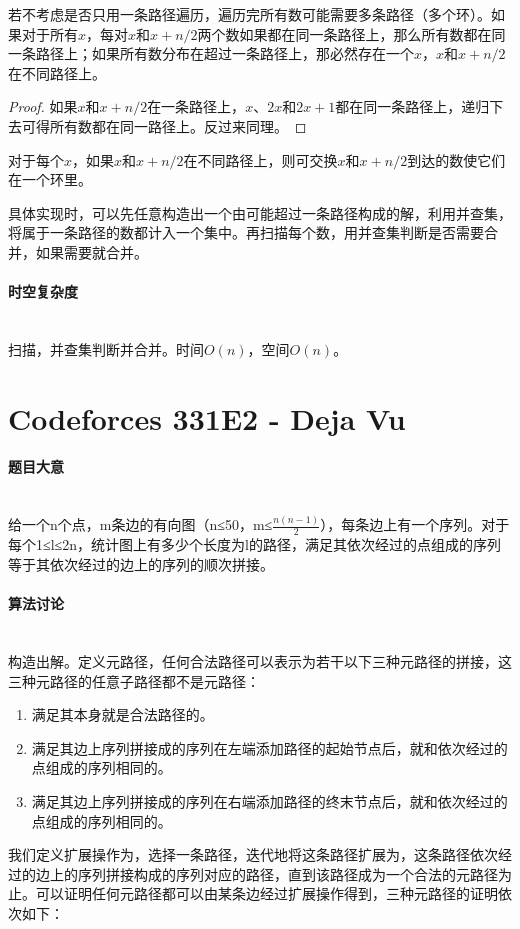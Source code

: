 \documentclass[UTF8]{ctexart}
\newcommand{\myparagraph}[1]{\paragraph{#1}\mbox{}\\}
\theoremstyle{nonumberplain}
\newtheorem{proof}{\hspace{1em}证明：}
\begin{document}
			若不考虑是否只用一条路径遍历，遍历完所有数可能需要多条路径（多个环）。如果对于所有$x$，每对$x$和$x+n/2$两个数如果都在同一条路径上，那么所有数都在同一条路径上；如果所有数分布在超过一条路径上，那必然存在一个$x$，$x$和$x+n/2$在不同路径上。
			
			\begin{proof} 如果$x$和$x+n/2$在一条路径上，$x$、$2x$和$2x+1$都在同一条路径上，递归下去可得所有数都在同一路径上。反过来同理。 \end{proof}
			
			对于每个$x$，如果$x$和$x+n/2$在不同路径上，则可交换$x$和$x+n/2$到达的数使它们在一个环里。
			
			具体实现时，可以先任意构造出一个由可能超过一条路径构成的解，利用并查集，将属于一条路径的数都计入一个集中。再扫描每个数，用并查集判断是否需要合并，如果需要就合并。
		
		\myparagraph{时空复杂度}
		
			扫描，并查集判断并合并。时间$O(n)$，空间$O(n)$。
	
	\section{Codeforces 331E2 - Deja Vu}
		
		\myparagraph{题目大意}
		
			给一个n个点，m条边的有向图（n≤50，m≤$\frac{n(n-1)}{2}$），每条边上有一个序列。对于每个1≤l≤2n，统计图上有多少个长度为l的路径，满足其依次经过的点组成的序列等于其依次经过的边上的序列的顺次拼接。
			
		\myparagraph{算法讨论}
		
			构造出解。定义元路径，任何合法路径可以表示为若干以下三种元路径的拼接，这三种元路径的任意子路径都不是元路径：
			
			\begin{enumerate}
				\item 满足其本身就是合法路径的。
				\item 满足其边上序列拼接成的序列在左端添加路径的起始节点后，就和依次经过的点组成的序列相同的。
				\item 满足其边上序列拼接成的序列在右端添加路径的终末节点后，就和依次经过的点组成的序列相同的。
			\end{enumerate}
			
			我们定义扩展操作为，选择一条路径，迭代地将这条路径扩展为，这条路径依次经过的边上的序列拼接构成的序列对应的路径，直到该路径成为一个合法的元路径为止。可以证明任何元路径都可以由某条边经过扩展操作得到，三种元路径的证明依次如下：
			
\end{document}
